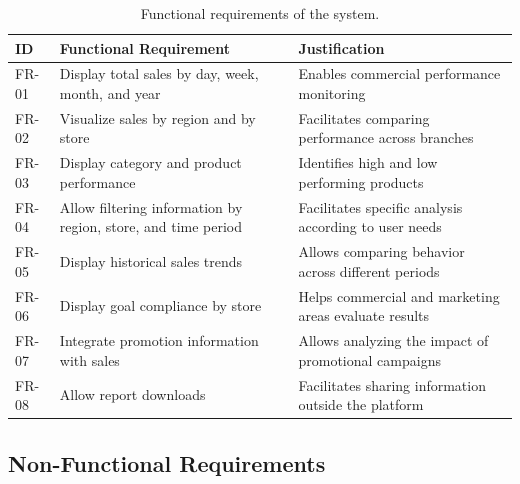 \documentclass[12pt,a4paper]{article}
\begin{document}
\begin{table}[H]
\centering
\small
\begin{tabular}{p{1.2cm} p{5.5cm} p{6cm}}
\toprule
\textbf{ID} & \textbf{Functional Requirement} & \textbf{Justification}\\
\midrule
FR-01 & Display total sales by day, week, month, and year & Enables commercial performance monitoring\\
FR-02 & Visualize sales by region and by store & Facilitates comparing performance across branches\\
FR-03 & Display category and product performance & Identifies high and low performing products\\
FR-04 & Allow filtering information by region, store, and time period & Facilitates specific analysis according to user needs\\
FR-05 & Display historical sales trends & Allows comparing behavior across different periods\\
FR-06 & Display goal compliance by store & Helps commercial and marketing areas evaluate results\\
FR-07 & Integrate promotion information with sales & Allows analyzing the impact of promotional campaigns\\
FR-08 & Allow report downloads & Facilitates sharing information outside the platform\\
\bottomrule
\end{tabular}
\caption{Functional requirements of the system.}
\end{table}

\subsection{Non-Functional Requirements}
\end{document}
